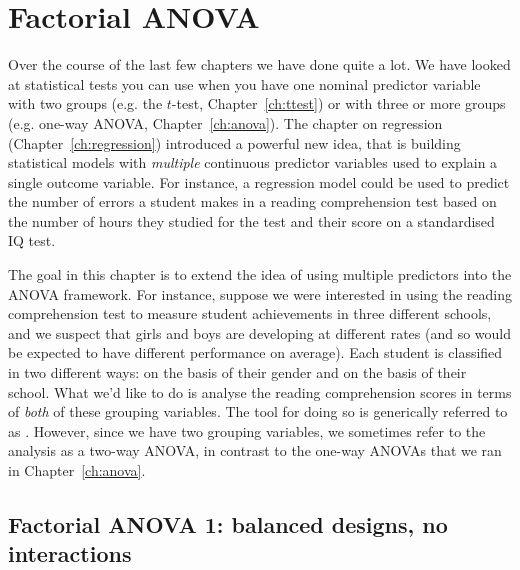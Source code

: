 
\chapter{Factorial ANOVA \label{ch:anova2}}

Over the course of the last few chapters we have done quite a lot. We have looked at statistical tests you can use when you have one nominal predictor variable with two groups (e.g. the $t$-test, Chapter~\ref{ch:ttest}) or with three or more groups (e.g. one-way ANOVA, Chapter~\ref{ch:anova}). The chapter on regression (Chapter~\ref{ch:regression}) introduced a powerful new idea, that is building statistical models with {\it multiple} continuous predictor variables used to explain a single outcome variable. For instance, a regression model could be used to predict the number of errors a student makes in a reading comprehension test based on the number of hours they studied for the test and their score on a standardised IQ test. 

The goal in this chapter is to extend the idea of using multiple predictors into the ANOVA framework. For instance, suppose we were interested in using the reading comprehension test to measure student achievements in three different schools, and we suspect that girls and boys are developing at different rates (and so would be expected to have different performance on average). Each student is classified in two different ways: on the basis of their gender and on the basis of their school. What we'd like to do is analyse the reading comprehension scores in terms of {\it both} of these grouping variables. The tool for doing so is generically referred to as . However, since we have two grouping variables, we sometimes refer to the analysis as a two-way ANOVA, in contrast to the one-way ANOVAs that we ran in Chapter~\ref{ch:anova}.


\section{Factorial ANOVA 1: balanced designs, no interactions\label{sec:factorialanovasimple}}

